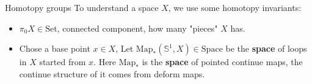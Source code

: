 \documentclass[12pt]{beamer}
\begin{document}
\begin{frame}{Homotopy groups}
To understand a space $X$, we use some homotopy invariants:
\pause
\begin{itemize}
  \item $\pi_0 X \in \mathrm{Set} $, connected component, how many "pieces" $X$ has. 
    \pause
  \item Chose a base point $x\in X$, Let $ \mathrm{Map}_*(\mathbb{S}^1,X)  \in \mathrm{Space}$ be the \textbf{space} of loops in $X$ started from $x$. Here $\mathrm{Map}_*$ is the \textbf{ space } of pointed continue maps, the continue structure of it comes from deform maps. 
\end{itemize}
\end{frame}
\end{document}
